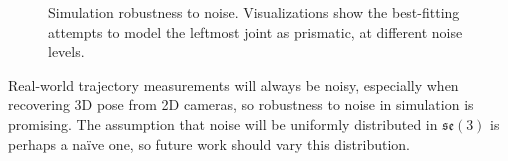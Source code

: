 \documentclass[a4paper,orivec]{llncs}
\begin{document}
\begin{figure}[ht]
{{
  }}
  \sbox{}
  \sbox{}
  \sbox{}

  \hspace{-.3in}
  \caption{Simulation robustness to noise. Visualizations show the best-fitting attempts to model the leftmost joint as prismatic, at different noise levels.}
  \label{fig:exp1}
  \vspace{-.2in}
\end{figure}

Real-world trajectory measurements will always be noisy, especially when recovering 3D pose from 2D cameras, so robustness to noise in simulation is promising. The assumption that noise will be uniformly distributed in $\mathfrak{se}(3)$ is perhaps a na\"{i}ve one, so future work should vary this distribution.
\end{document}
